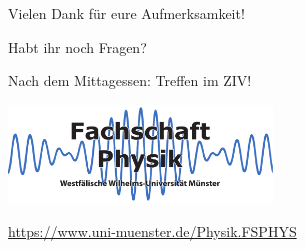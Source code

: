 \section*{}

\begin{frame}
	\begin{block}{}
		\centering
		Vielen Dank für eure Aufmerksamkeit!
	\end{block}

	\begin{block}{}
		\centering
		Habt ihr noch Fragen?
	\end{block}
	
	\begin{block}{}
		\centering\LARGE
		Nach dem Mittagessen: Treffen im ZIV!
	\end{block}

	\begin{center}
		\includegraphics[width=7cm]{res/logo.pdf}
		
		\medskip
		\url{https://www.uni-muenster.de/Physik.FSPHYS}
	\end{center}
\end{frame}


